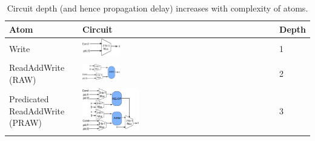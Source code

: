 \begin{table}[!t]
  \begin{scriptsize}
    \begin{tabular}{|p{}|p{}|p{}|}
  \hline
  Atom & Circuit & Depth \\
  \hline
  Write & \includegraphics[width=0.2\textwidth]{rw.pdf} & 1 \\
  \hline
  ReadAddWrite (RAW) & \includegraphics[width=0.2\textwidth]{raw.pdf} & 2\\
  \hline
  \pbox{0.1\textwidth}
  {Predicated\\
  ReadAddWrite (PRAW)} & \includegraphics[width=0.3\textwidth]{pred_raw.pdf}  & 3\\
  \hline
  \end{tabular}
\end{scriptsize}
\caption{Circuit depth (and hence propagation delay) increases with complexity of atoms.}
  \label{tab:circuit_depth}
\end{table}


